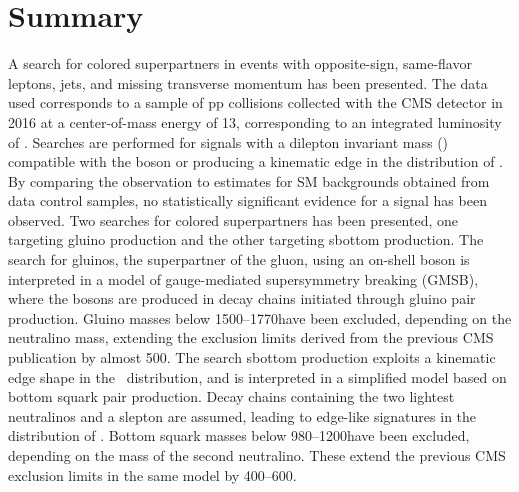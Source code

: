 \section{Summary}
\noindent
\justify
A search for colored superpartners in events with opposite-sign, same-flavor leptons, jets, and missing transverse momentum has been presented. 
The data used corresponds to a sample of pp collisions collected with the CMS detector in 2016 at a center-of-mass energy of 13\TeV, corresponding to an integrated luminosity of \lint.
Searches are performed for signals with a dilepton invariant mass (\mll) compatible with the \PZ boson or producing a kinematic edge in the distribution of \mll.
By comparing the observation to estimates for SM backgrounds obtained from data control samples, no statistically significant evidence for a signal has been observed.
\newpara
\noindent\justify
Two searches for colored superpartners has been presented, one targeting gluino production and the other targeting sbottom production. 
The search for gluinos, the superpartner of the gluon, using an on-shell \PZ boson is interpreted in a model of gauge-mediated supersymmetry breaking (GMSB), where the \PZ bosons are produced in decay chains initiated through gluino pair production.
Gluino masses below 1500--1770\GeV have been excluded, depending on the neutralino mass, extending the exclusion limits derived from the previous CMS publication by almost 500\GeV.
The search sbottom production exploits a kinematic edge shape in the \mll\ distribution, and is interpreted in a simplified model based on bottom squark pair production.
Decay chains containing the two lightest neutralinos and a slepton are assumed, leading to edge-like signatures in the distribution of \mll.
Bottom squark masses below 980--1200\GeV have been excluded, depending on the mass of the second neutralino.
These extend the previous CMS exclusion limits in the same model by 400--600\GeV.
